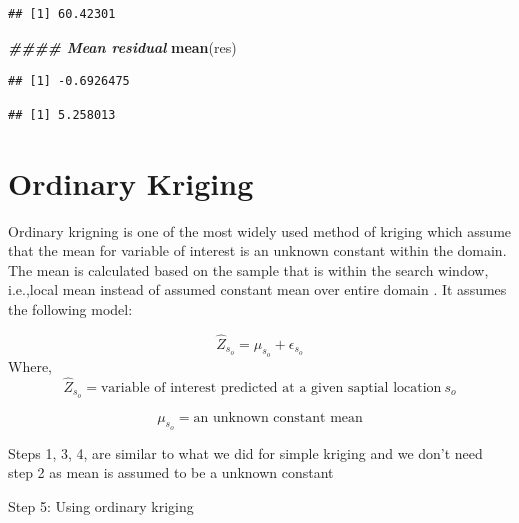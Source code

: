 \documentclass[
]{book}
\newenvironment{Shaded}{\begin{snugshade}}{\end{snugshade}}
\newcommand{\DecValTok}[1]{\textcolor[rgb]{0.00,0.00,0.81}{#1}}
\newcommand{\DocumentationTok}[1]{\textcolor[rgb]{0.56,0.35,0.01}{\textbf{\textit{#1}}}}
\newcommand{\FunctionTok}[1]{\textcolor[rgb]{0.13,0.29,0.53}{\textbf{#1}}}
\newcommand{\NormalTok}[1]{#1}
\newcommand{\SpecialCharTok}[1]{\textcolor[rgb]{0.81,0.36,0.00}{\textbf{#1}}}
\begin{document}
\begin{verbatim}
## [1] 60.42301
\end{verbatim}

\begin{Shaded}
\begin{Highlighting}[]
\DocumentationTok{\#\#\#\# Mean residual}
\FunctionTok{mean}\NormalTok{(res)}
\end{Highlighting}
\end{Shaded}

\begin{verbatim}
## [1] -0.6926475
\end{verbatim}

\begin{Shaded}
\end{Shaded}

\begin{verbatim}
## [1] 5.258013
\end{verbatim}

\hypertarget{ordinary-kriging}{%
\section{Ordinary Kriging}\label{ordinary-kriging}}

Ordinary krigning \citep{matheron_intrinsic_1973} is one of the most widely used method of kriging which assume that the mean for variable of interest is an unknown constant within the domain. The mean is calculated based on the sample that is within the search window, i.e.,local mean instead of assumed constant mean over entire domain \citep{clark_practical_2007} \citep{goovaerts_kriging_2008}. It assumes the following model:

\[\hat{Z}_{s_o}=\mu_{s_o} + \epsilon_{s_o}\]
Where, \[\hat{Z}_{s_o}=\text{variable of interest predicted at a given saptial location}\ s_{o}\]

\[\mu_{s_o}=\text{an unknown constant mean}\]

Steps 1, 3, 4, are similar to what we did for simple kriging and we don't need step 2 as mean is assumed to be a unknown constant

Step 5: Using ordinary kriging
\end{document}
